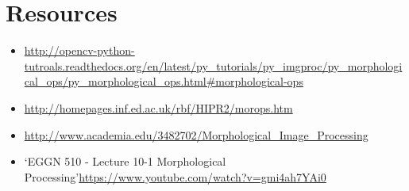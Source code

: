 \documentclass[]{article}
\providecommand{\tightlist}{%
  \setlength{\itemsep}{0pt}\setlength{\parskip}{0pt}}
\begin{document}
\section{Resources}\label{resources}

\begin{itemize}
\tightlist
\item
  \url{http://opencv-python-tutroals.readthedocs.org/en/latest/py_tutorials/py_imgproc/py_morphological_ops/py_morphological_ops.html\#morphological-ops}
\item
  \url{http://homepages.inf.ed.ac.uk/rbf/HIPR2/morops.htm}
\item
  \url{http://www.academia.edu/3482702/Morphological_Image_Processing}
\item
  `EGGN 510 - Lecture 10-1 Morphological
  Processing'\url{https://www.youtube.com/watch?v=gmi4ah7YAi0}
\end{itemize}
\end{document}
